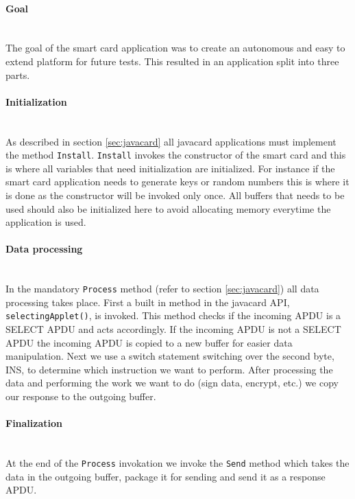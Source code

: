 \paragraph{Goal}\mbox{}\\
The goal of the smart card application was to create an autonomous and easy to extend platform for future tests. This resulted in an application split into three parts.

\paragraph{Initialization}\mbox{}\\
As described in section \ref{sec:javacard} all javacard applications must implement the method \texttt{Install}. \texttt{Install} invokes the constructor of the smart card and this is where all variables that need initialization are initialized. For instance if the smart card application needs to generate keys or random numbers this is where it is done as the constructor will be invoked only once. All buffers that needs to be used should also be initialized here to avoid allocating memory everytime the application is used.

\paragraph{Data processing}\mbox{}\\
In the mandatory \texttt{Process} method (refer to section \ref{sec:javacard}) all data processing takes place. First a built in method in the javacard API, \texttt{selectingApplet()}, is invoked. This method checks if the incoming APDU is a SELECT APDU and acts accordingly. If the incoming APDU is not a SELECT APDU the incoming APDU is copied to a new buffer for easier data manipulation. Next we use a switch statement switching over the second byte, INS, to determine which instruction we want to perform. After processing the data and performing the work we want to do (sign data, encrypt, etc.) we copy our response to the outgoing buffer.

\paragraph{Finalization}\mbox{}\\
At the end of the \texttt{Process} invokation we invoke the \texttt{Send} method which takes the data in the outgoing buffer, package it for sending and send it as a response APDU.

